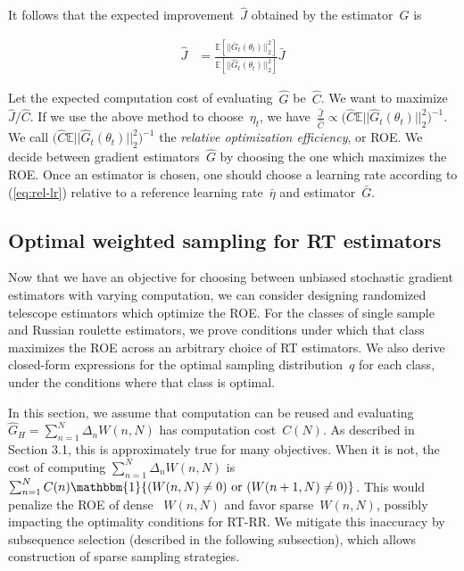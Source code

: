 It follows that the expected improvement~$\hat{J}$ obtained by the estimator~$\hat{G}$ is
\vspace{-1.75\baselineskip}

\begin{align}
\hat{J} &= \frac{\mathbb{E}[||\bar{G}_t(\theta_{t})||_2^2]}{\mathbb{E}[||\hat{G}_t(\theta_{t})||_2^2]} \bar{J}
\end{align}
\vspace{-1.25\baselineskip}

Let the expected computation cost of evaluating~$\hat{G}$ be~$\hat{C}$.
We want to maximize~$\hat{J}/\hat{C}$.
If we use the above method to choose~$\eta_t$, we have~${\frac{\hat{J}}{\hat{C}} \propto \big(\hat{C} \mathbb{E} ||\hat{G}_t(\theta_{t})||_2^2 \big)^{-1}}$.
We call ${\big(\hat{C} \mathbb{E} ||\hat{G}_t(\theta_{t})||_2^2\big)^{-1}}$ the \textit{relative optimization efficiency}, or ROE.
We decide between gradient estimators~$\hat{G}$ by choosing the one which maximizes the ROE.
Once an estimator is chosen, one should choose a learning rate according to (\ref{eq:rel-lr}) relative to a reference learning rate~$\bar{\eta}$ and estimator~$\bar{G}$.

\subsection{Optimal weighted sampling for RT estimators}
Now that we have an objective for choosing between unbiased stochastic gradient estimators with varying computation, we can consider designing randomized telescope estimators which optimize the ROE.
For the classes of single sample and Russian roulette estimators, we prove conditions under which that class maximizes the ROE across an arbitrary choice of RT estimators.
We also derive closed-form expressions for the optimal sampling distribution~$q$ for each class, under the conditions where that class is optimal.

In this section, we assume that computation can be reused and evaluating~${\hat{G}_H = \sum_{n=1}^N \Delta_n W(n, N)}$ has computation cost~$C(N)$.
As described in Section 3.1, this is approximately true for many objectives.
When it is not, the cost of computing $\sum_{n=1}^N \Delta_n W(n, N)$ is $\sum_{n=1}^N C(n) \mathbbm{1}\{(W(n, N) \neq 0) \text{ or } (W(n+1, N) \neq 0) \}$.
This would penalize the ROE of dense ~$W(n, N)$ and favor sparse~$W(n, N)$, possibly impacting the optimality conditions for RT-RR.
We mitigate this inaccuracy by subsequence selection (described in the following subsection), which allows construction of sparse sampling strategies.

